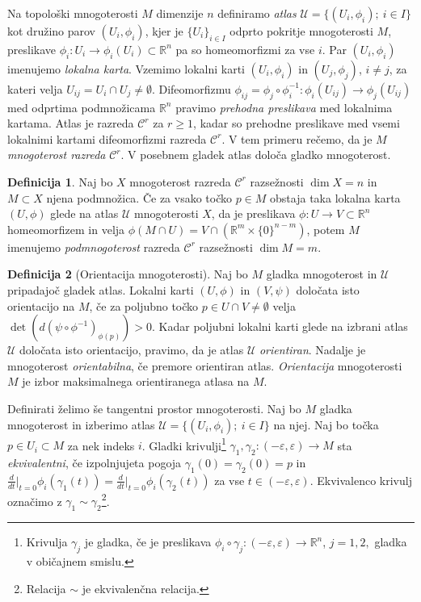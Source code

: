 \documentclass[12pt,a4paper,twoside]{article}
\theoremstyle{definition} %
\newtheorem{definicija}{Definicija}[section]
\theoremstyle{plain} %
\numberwithin{equation}{section}  %
\newcommand{\R}{\mathbb R}
\begin{document}
Na topološki mnogoterosti $M$ dimenzije $n$ definiramo \emph{atlas} $\mathcal{U} = \{ (U_{i}, \phi_{i}) ; \ i \in I \}$ kot družino parov $(U_{i}, \phi_{i})$, kjer je $\{ U_{i} \}_{i \in I}$ odprto pokritje mnogoterosti $M$, preslikave $\phi_{i} \colon U_{i} \to \phi_{i}(U_{i}) \subset \R^{n}$ pa so homeomorfizmi za vse $i$. Par $(U_{i}, \phi_{i})$ imenujemo \emph{lokalna karta}.
Vzemimo lokalni karti $(U_{i}, \phi_{i})$ in $(U_{j}, \phi_{j})$, $i \neq j$, za kateri velja $U_{ij}=U_{i} \cap U_{j} \neq \emptyset$. Difeomorfizmu $\phi_{ij} = \phi_{j} \circ \phi_{i}^{-1} \colon \phi_{i}(U_{ij}) \to \phi_{j}(U_{ij})$ med odprtima podmnožicama $\R^{n}$ pravimo \emph{prehodna preslikava} med lokalnima kartama. Atlas je razreda $\mathcal{C}^{r}$ za $r \geq 1$, kadar so prehodne preslikave med vsemi lokalnimi kartami difeomorfizmi razreda $\mathcal{C}^{r}$. V tem primeru rečemo, da je $M$ \emph{mnogoterost razreda} $\mathcal{C}^{r}$.
V posebnem gladek atlas določa gladko mnogoterost.

\begin{definicija}
Naj bo $X$ mnogoterost razreda $\mathcal{C}^{r}$ razsežnosti $\dim X = n$ in $M \subset X$ njena podmnožica. Če za vsako točko $p \in M$ obstaja taka lokalna karta $(U, \phi)$ glede na atlas $\mathcal{U}$ mnogoterosti $X$, da je preslikava $\phi \colon U \to V \subset \mathbb{R}^{n}$ homeomorfizem in velja $\phi (M \cap U) = V \cap (\mathbb{R}^{m} \times \{0\}^{n-m})$, potem $M$ imenujemo \emph{podmnogoterost} razreda $\mathcal{C}^{r}$ razsežnosti $\dim M = m$.
\end{definicija}

\begin{definicija} [Orientacija mnogoterosti]
Naj bo $M$ gladka mnogoterost in $\mathcal{U}$ pripadajoč gladek atlas. Lokalni karti $(U, \phi)$ in $(V, \psi)$ določata isto orientacijo na $M$, če za poljubno točko $p \in U \cap V \neq \emptyset$ velja $\det (d(\psi \circ \phi ^{-1})_{\phi (p)}) > 0.$ Kadar poljubni lokalni karti glede na izbrani atlas $\mathcal{U}$ določata isto orientacijo, pravimo, da je atlas $\mathcal{U}$ \emph{orientiran}. Nadalje je mnogoterost \emph{orientabilna}, če premore orientiran atlas. \emph{Orientacija} mnogoterosti $M$ je izbor maksimalnega orientiranega atlasa na $M$.
\end{definicija}

Definirati želimo še tangentni prostor mnogoterosti. Naj bo $M$ gladka mnogoterost in izberimo atlas $\mathcal{U} = \{ (U_{i}, \phi_{i}) ; \ i \in I \}$ na njej. Naj bo točka $p \in U_{i} \subset M$ za nek indeks $i$.  Gladki krivulji\footnote{Krivulja $\gamma_{j}$ je gladka, če je preslikava $ \phi_{i} \circ \gamma_{j} \colon (-\varepsilon, \varepsilon) \to \mathbb{R}^{n}$, $j=1,2,$ gladka v običajnem smislu.} 
$\gamma_{1}, \gamma_{2} \colon (-\varepsilon, \varepsilon) \to M$ sta \emph{ekvivalentni}, če izpolnjujeta pogoja
$\gamma_{1}(0) = \gamma_{2}(0) = p$ in $ \frac{d}{dt} \big|_{t=0} \phi_{i}(\gamma_{1}(t)) =  \frac{d}{dt} \big|_{t=0} \phi_{i}(\gamma_{2}(t))$ za vse $t \in (-\varepsilon, \varepsilon)$. Ekvivalenco krivulj označimo z $\gamma_{1} \sim \gamma_{2}$\footnote{Relacija $\sim$ je ekvivalenčna relacija.}.
\end{document}
